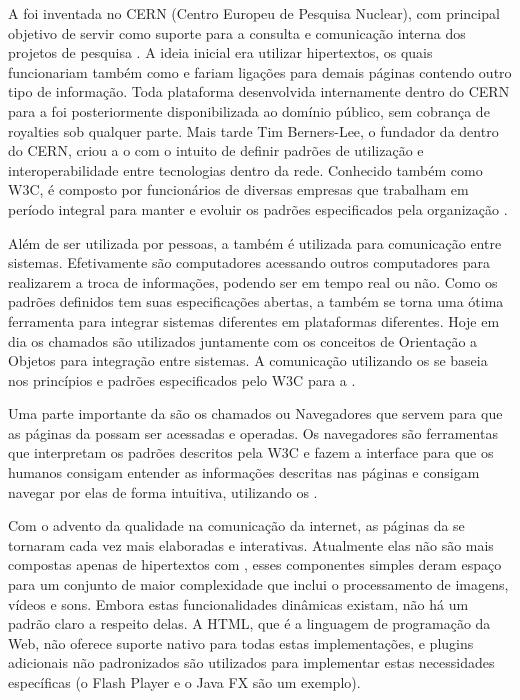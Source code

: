 \documentclass[espaco=simples,appendix=Name]{abnt}
\begin{document}
A  foi inventada no CERN (Centro Europeu de Pesquisa Nuclear), com principal objetivo de servir como suporte para a consulta e comunicação interna dos projetos de pesquisa \cite{WebStory}. A ideia inicial era utilizar hipertextos, os quais funcionariam também como  e fariam ligações para demais páginas contendo outro tipo de informação. Toda plataforma desenvolvida internamente dentro do CERN para a  foi posteriormente disponibilizada ao domínio público, sem cobrança de royalties sob qualquer parte. Mais tarde Tim Berners-Lee, o fundador da  dentro do CERN, criou a o  com o intuito de definir padrões de utilização e interoperabilidade entre tecnologias dentro da rede. Conhecido também como W3C, é composto por funcionários de diversas empresas que trabalham em período integral para manter e evoluir os padrões especificados pela organização \cite{W3Cfacts}.

Além de ser utilizada por pessoas, a  também é utilizada para comunicação entre sistemas. Efetivamente são computadores acessando outros computadores para realizarem a troca de informações, podendo ser em tempo real ou não. Como os padrões definidos tem suas especificações abertas, a  também se torna uma ótima ferramenta para integrar sistemas diferentes em plataformas diferentes. Hoje em dia os chamados  são utilizados juntamente com os conceitos de Orientação a Objetos para integração entre sistemas. A comunicação utilizando os  se baseia nos princípios e padrões especificados pelo W3C para a  \cite{WebServices}.

Uma parte importante da  são os chamados  ou Navegadores que servem para que as páginas da  possam ser acessadas e operadas. Os navegadores são ferramentas que interpretam os padrões descritos pela W3C e fazem a interface para que os humanos consigam entender as informações descritas nas páginas e consigam navegar por elas de forma intuitiva, utilizando os .

Com o advento da qualidade na comunicação da internet, as páginas da  se tornaram cada vez mais elaboradas e interativas. Atualmente elas não são mais compostas apenas de hipertextos com , esses componentes simples deram espaço para um conjunto de maior complexidade que inclui o processamento de imagens, vídeos e sons. Embora estas funcionalidades dinâmicas existam, não há um padrão claro a respeito delas. A HTML, que é a linguagem de programação da Web, não oferece suporte nativo para todas estas implementações, e plugins adicionais não padronizados são utilizados para implementar estas necessidades específicas (o Flash Player e o Java FX são um exemplo).
\end{document}
